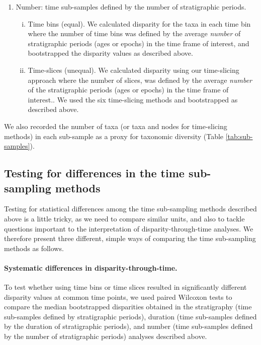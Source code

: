 \documentclass[12pt,a4paper]{article}
\begin{document}
\begin{enumerate}
  \item Number: time sub-samples defined by the number of stratigraphic periods. 
  \begin{enumerate}[(i)]
    \item Time bins (equal). 
    We calculated disparity for the taxa in each time bin where the number of time bins was defined by the average \textit{number} of stratigraphic periods (ages or epochs) in the time frame of interest, and bootstrapped the disparity values as described above.
    \item Time-slices (unequal).
    We calculated disparity using our time-slicing approach where the number of slices, was defined by the average \textit{number} of the stratigraphic periods (ages or epochs) in the time frame of interest..
    We used the six time-slicing methods and bootstrapped as described above.
  \end{enumerate}


\end{enumerate}

We also recorded the number of taxa (or taxa and nodes for time-slicing methods) in each sub-sample as a proxy for taxonomic diversity (Table \ref{tab:sub-samples}).

\subsection{Testing for differences in the time sub-sampling methods}
\label{testing}
Testing for statistical differences among the time sub-sampling methods described above is a little tricky, as we need to compare similar units, and also to tackle questions important to the interpretation of disparity-through-time analyses. 
We therefore present three different, simple ways of comparing the time sub-sampling methods as follows.

\paragraph{Systematic differences in disparity-through-time.} 
To test whether using time bins or time slices resulted in significantly different disparity values at common time points, we used paired Wilcoxon tests to compare the median bootstrapped disparities obtained in the stratigraphy (time sub-samples defined by stratigraphic periods), duration (time sub-samples defined by the duration of stratigraphic periods), and number (time sub-samples defined by the number of stratigraphic periods) analyses described above.
\end{document}
